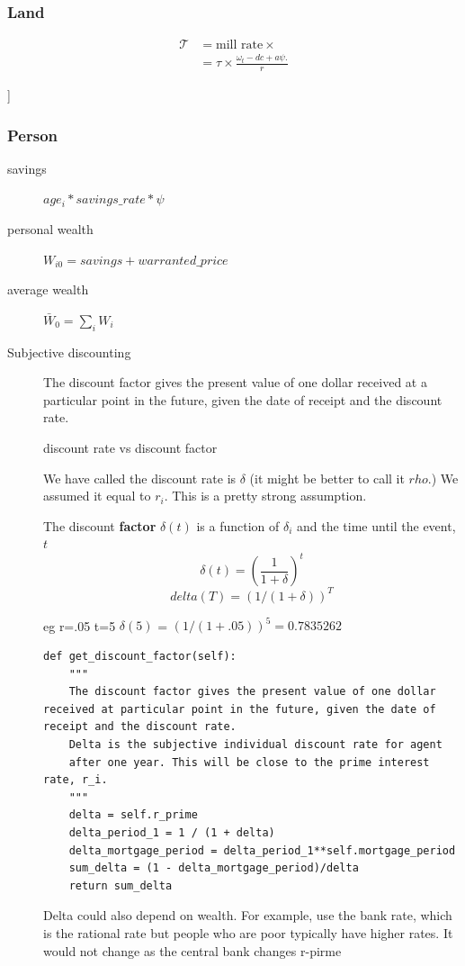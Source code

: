 \subsubsection{Land}
\begin{description}
{\color{red}
\item[property taxes]
\begin{align*}
\mathcal{T} &= \text{mill rate} \times  \\
&= \tau \times \frac{\omega_t- {dc} + a\psi.}{r}
\end{align*}
}
]
\end{description}


\subsubsection{Person}
\begin{description}
\item [savings] $age_i*savings\_rate*\psi$
\item[personal wealth] $W_{i0}= savings + warranted\_price $
\item[average wealth] $\bar W_{0}= \sum_i W_i$
\item[Subjective discounting] The discount factor gives the present value of one dollar received at a particular point in the future, given the date of receipt and the discount rate.

{discount rate vs discount factor}

We have called the  discount rate is $\delta$ (it might be better to call it $rho$.) We assumed it equal to $r_i$. This is a pretty strong assumption.

The discount \textbf{factor} $\delta(t)$ is a function of $\delta_i$ and the time until the event, $t$
\[\delta(t)=\left(\frac{1}{1+\delta}\right)^t\]
\[delta(T)=  (1/(1+\delta))^T\]   
    

eg r=.05  t=5  $\delta(5)$ =  $(1/(1+.05))^5 = 0.7835262$


\begin{lstlisting}
def get_discount_factor(self):
    """
    The discount factor gives the present value of one dollar received at particular point in the future, given the date of receipt and the discount rate.
    Delta is the subjective individual discount rate for agent
    after one year. This will be close to the prime interest rate, r_i.
    """    
    delta = self.r_prime
    delta_period_1 = 1 / (1 + delta) 
    delta_mortgage_period = delta_period_1**self.mortgage_period
    sum_delta = (1 - delta_mortgage_period)/delta
    return sum_delta
\end{lstlisting}
Delta could also depend on wealth. For example,  use the bank rate, which is the rational rate but people who are poor typically have higher rates.  It would not change as the central bank changes r-pirme


\end{description}
